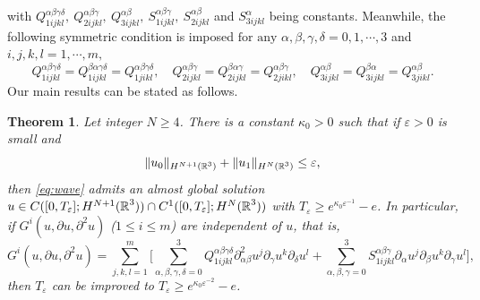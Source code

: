 \documentclass[11pt,twoside]{article}
\def\R{\mathop{\mathbb R\kern 0pt}\nolimits}
\def\ds{\displaystyle}
\def\p{\partial}
\def\ve{\varepsilon}
\theoremstyle{plain}
\newtheorem{theorem}{Theorem}[section]
\theoremstyle{definition}
\numberwithin{equation}{section}
\begin{document}
with $Q^{\alpha\beta\gamma\delta}_{1ijkl},\ Q^{\alpha\beta\gamma}_{2ijkl},\ Q^{\alpha\beta}_{3ijkl},\ S^{\alpha\beta\gamma}_{1ijkl},\ S^{\alpha\beta}_{2ijkl}$ and $S^{\alpha}_{3ijkl}$ being constants. Meanwhile, the following symmetric condition is imposed $\text{for any } \alpha, \beta, \gamma, \delta = 0, 1, \cdots, 3$ and $i,j,k,l =1,\cdots, m,$
\begin{equation}\label{eq:symmetric condition}
Q^{\alpha\beta\gamma\delta}_{1ijkl} = Q^{\beta\alpha\gamma\delta}_{1ijkl} = Q^{\alpha\beta\gamma\delta}_{1jikl},
\quad Q^{\alpha\beta\gamma}_{2ijkl} = Q^{\beta\alpha\gamma}_{2ijkl} = Q^{\alpha\beta\gamma}_{2jikl},
\quad Q^{\alpha\beta}_{3ijkl} = Q^{\beta\alpha}_{3ijkl} = Q^{\alpha\beta}_{3jikl}.
\end{equation}
Our main results can be stated as follows.
\begin{theorem}\label{thm:1}
Let integer $N \ge 4$. There is a constant $\kappa_0>0$ such that if $\ve>0$ is small and
\begin{equation}\label{initial:data}
\|u_{0}\|_{H^{N+1}(\R^3)}+\|u_{1}\|_{H^N(\R^3)}\le\ve,
\end{equation}
then \eqref{eq:wave} admits an almost global solution $u\in C([0,T_\ve];H^{N+1}(\R^3))\cap C^1([0,T_\ve];H^N(\R^3))$ with $T_\ve \ge e^{\kappa_0\ve^{-1}}-e$. In particular, if $G^i(u,\p u,\p^2 u)$ ($1\le i\le m$) are independent of $u$,
that is,
\begin{equation}\label{eq:C independent u}
G^i(u,\p u,\p^2 u)=\ds\sum_{j,k,l=1}^m \big[\ds\sum_{\alpha,\beta,\gamma,\delta=0}^3 Q^{\alpha\beta\gamma\delta}_{1ijkl} \partial_{\alpha\beta}^2 u^j\partial_\gamma u^k\partial_\delta u^l+\ds\sum_{\alpha,\beta,\gamma=0}^3 S^{\alpha\beta\gamma}_{1ijkl}\partial_{\alpha} u^j \partial_\beta u^k\partial_\gamma u^l\big],
\end{equation}
then $T_\varepsilon$ can be improved to $T_\varepsilon\ge e^{\kappa_0 \varepsilon^{-2}}-e$.
\end{theorem}
\end{document}
